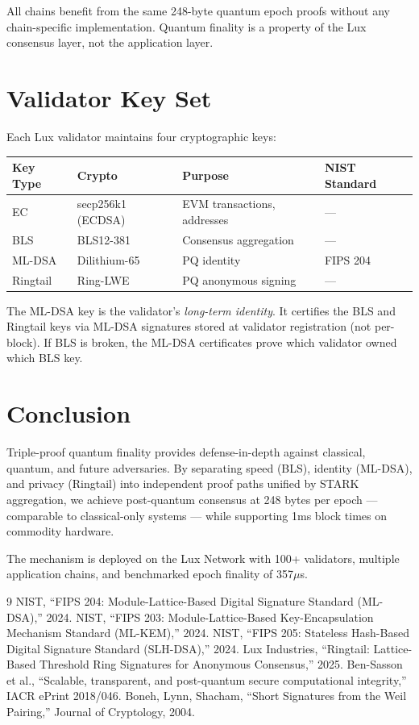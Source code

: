 \documentclass[11pt,a4paper]{article}
\begin{document}
All chains benefit from the same 248-byte quantum epoch proofs without any chain-specific implementation. Quantum finality is a property of the Lux consensus layer, not the application layer.

\section{Validator Key Set}

Each Lux validator maintains four cryptographic keys:

\begin{center}
\begin{tabular}{llll}
\toprule
\textbf{Key Type} & \textbf{Crypto} & \textbf{Purpose} & \textbf{NIST Standard} \\
\midrule
EC & secp256k1 (ECDSA) & EVM transactions, addresses & --- \\
BLS & BLS12-381 & Consensus aggregation & --- \\
ML-DSA & Dilithium-65 & PQ identity & FIPS 204 \\
Ringtail & Ring-LWE & PQ anonymous signing & --- \\
\bottomrule
\end{tabular}
\end{center}

The ML-DSA key is the validator's \textit{long-term identity}. It certifies the BLS and Ringtail keys via ML-DSA signatures stored at validator registration (not per-block). If BLS is broken, the ML-DSA certificates prove which validator owned which BLS key.

\section{Conclusion}

Triple-proof quantum finality provides defense-in-depth against classical, quantum, and future adversaries. By separating speed (BLS), identity (ML-DSA), and privacy (Ringtail) into independent proof paths unified by STARK aggregation, we achieve post-quantum consensus at 248 bytes per epoch --- comparable to classical-only systems --- while supporting 1ms block times on commodity hardware.

The mechanism is deployed on the Lux Network with 100+ validators, multiple application chains, and benchmarked epoch finality of 357$\mu$s.

\begin{thebibliography}{9}
 NIST, ``FIPS 204: Module-Lattice-Based Digital Signature Standard (ML-DSA),'' 2024.
 NIST, ``FIPS 203: Module-Lattice-Based Key-Encapsulation Mechanism Standard (ML-KEM),'' 2024.
 NIST, ``FIPS 205: Stateless Hash-Based Digital Signature Standard (SLH-DSA),'' 2024.
 Lux Industries, ``Ringtail: Lattice-Based Threshold Ring Signatures for Anonymous Consensus,'' 2025.
 Ben-Sasson et al., ``Scalable, transparent, and post-quantum secure computational integrity,'' IACR ePrint 2018/046.
 Boneh, Lynn, Shacham, ``Short Signatures from the Weil Pairing,'' Journal of Cryptology, 2004.
\end{thebibliography}
\end{document}
